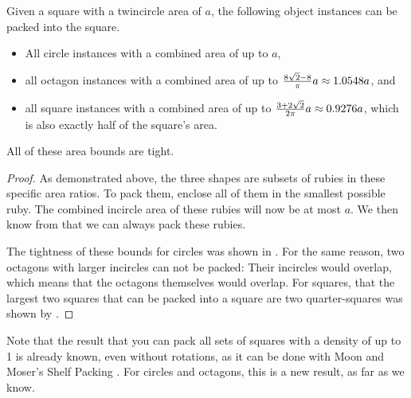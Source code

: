 \documentclass[a4paper,style=print,oneside,bibliography=totoc,nexus,lnum,extramargin]{tubsbook}
\begin{document}
\begin{corollary}
    Given a square with a twincircle area of $a$, the following object instances can be packed into the square.

    \begin{itemize}
        \item All circle instances with a combined area of up to $a$,
        \item all octagon instances with a combined area of up to $\frac{8\sqrt{2}-8}{\pi}a \approx 1.0548a$, and
        \item all square instances with a combined area of up to $\frac{3+2\sqrt{2}}{2\pi}a \approx 0.9276a$, which is also exactly half of the square's area.
    \end{itemize}

    All of these area bounds are tight.
\end{corollary}

\begin{proof}
    As demonstrated above, the three shapes are subsets of rubies in these specific area ratios. To pack them, enclose all of them in the smallest possible ruby. The combined incircle area of these rubies will now be at most $a$. We then know from  that we can always pack these rubies.

    The tightness of these bounds for circles was shown in . For the same reason, two octagons with larger incircles can not be packed: Their incircles would overlap, which means that the octagons themselves would overlap. For squares, that the largest two squares that can be packed into a square are two quarter-squares was shown by \textcite{gobel1979geometrical}.
\end{proof}

Note that the result that you can pack all sets of squares with a density of up to 1 is already known, even without rotations, as it can be done with Moon and Moser's Shelf Packing \cite{MM1967some}. For circles and octagons, this is a new result, as far as we know.

%
%
%
\end{document}
